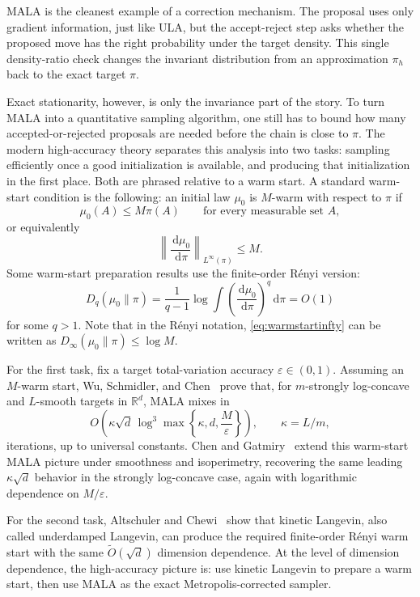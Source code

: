 \documentclass{amsart}
\numberwithin{equation}{section}
\theoremstyle{plain}
\theoremstyle{definition}
\theoremstyle{remark}
\newcommand{\R}{\mathbb{R}}
\newcommand{\dd}{\,\mathrm{d}}
\newcommand{\deltaerr}{\varepsilon}
\newcommand{\tO}{\widetilde O}
\begin{document}
MALA is the cleanest example of a correction mechanism.  The
proposal uses only gradient information, just like ULA, but the accept-reject
step asks whether the proposed move has the right probability under the target
density.  This single density-ratio check changes the invariant distribution
from an approximation $\pi_h$ back to the exact target $\pi$.

Exact stationarity, however, is only the invariance part of the story.  To turn
MALA into a quantitative sampling algorithm, one still has to bound how many
accepted-or-rejected proposals are needed before the chain is close to $\pi$.
The modern high-accuracy theory separates this analysis into two tasks:
sampling efficiently once a good initialization is available, and producing
that initialization in the first place.  Both are phrased relative to a warm
start.  A standard warm-start condition is the following: an initial law
$\mu_0$ is $M$-warm with respect to
$\pi$ if
\[
    \mu_0(A)\leq M\pi(A)
    \qquad\text{for every measurable set }A,
\]
or equivalently
\begin{equation}\label{eq:warmstartinfty}
    \left\|\frac{\dd\mu_0}{\dd\pi}\right\|_{L^\infty(\pi)}
    \leq M.
\end{equation}
Some warm-start preparation results use the
finite-order R\'enyi version:
\[
    D_q(\mu_0\|\pi)
    =
    \frac{1}{q-1}
    \log
    \int
    \left(\frac{\dd\mu_0}{\dd\pi}\right)^q
    \dd\pi
    =O(1)
\]
for some $q>1$. Note that in the R\'enyi notation, \eqref{eq:warmstartinfty} can be written as
$D_\infty(\mu_0\|\pi)\leq \log M$.

For the first task, fix a target total-variation accuracy
$\deltaerr\in(0,1)$.  Assuming an $M$-warm start, Wu, Schmidler, and
Chen~\cite{wu2022minimaxmala} prove that, for $m$-strongly log-concave
and $L$-smooth targets in $\R^d$, MALA mixes in
\[
    O\!\left(
        \kappa\sqrt d\,
        \log^3\!\max\left\{\kappa,d,\frac{M}{\deltaerr}\right\}
    \right),
    \qquad \kappa=L/m,
\]
iterations, up to universal constants.  Chen and
Gatmiry~\cite{chen2023simplemala} extend this warm-start MALA picture under
smoothness and isoperimetry, recovering the same leading $\kappa\sqrt d$
behavior in the strongly log-concave case, again with logarithmic dependence
on $M/\deltaerr$.

For the second task, Altschuler and
Chewi~\cite{altschuler2023warmstarts} show that kinetic Langevin, also called
underdamped Langevin, can produce the required finite-order R\'enyi warm start
with the same $\tO(\sqrt d)$ dimension dependence.  At the level of
dimension dependence, the high-accuracy picture is: use kinetic Langevin to
prepare a warm start, then use MALA as the exact Metropolis-corrected sampler.
\end{document}
